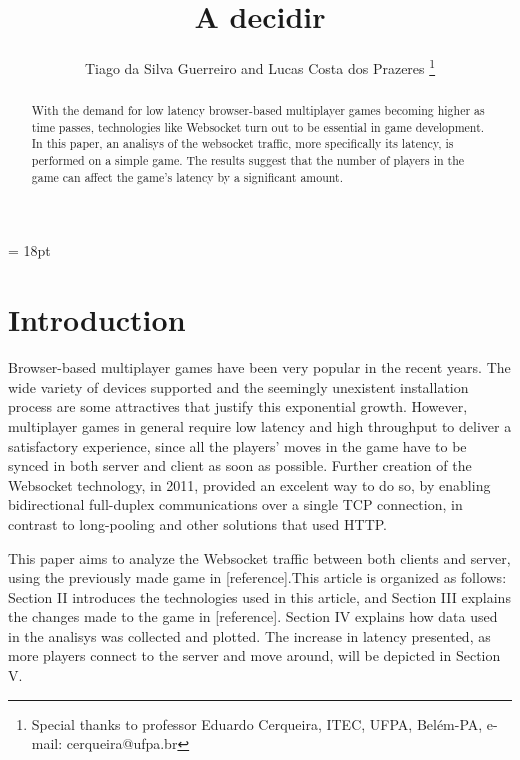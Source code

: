 \documentclass[english]{sbrt}
\begin{document}

\title{A decidir}

\author{Tiago da Silva Guerreiro and Lucas Costa dos Prazeres
  \thanks{Special thanks to professor Eduardo Cerqueira, ITEC, UFPA, Belém-PA, e-mail: cerqueira@ufpa.br}
}

\maketitle

\baselineskip = 18pt


\begin{abstract}
  With the demand for low latency browser-based multiplayer games becoming higher as time passes, technologies like Websocket turn out to be essential in game development. In this paper, an analisys of the websocket traffic, more specifically its latency, is performed on a simple game. The results suggest that the number of players in the game can affect the game's latency by a significant amount.
\end{abstract}

\begin{keywords}

\end{keywords}

\section{\textbf{Introduction}}
Browser-based multiplayer games have been very popular in the recent years. The wide variety of devices supported and the seemingly unexistent installation process are some attractives that justify this exponential growth. However, multiplayer games in general require low latency and high throughput to deliver a satisfactory experience, since all the players' moves in the game have to be synced in both server and client as soon as possible. Further creation of the Websocket technology, in 2011, provided an excelent way to do so, by enabling bidirectional full-duplex communications over a single TCP connection, in contrast to long-pooling and other solutions that used HTTP.

This paper aims to analyze the Websocket traffic between both clients and server, using the previously made game in [reference].This article is organized as follows: Section II introduces the technologies used in this article, and Section III explains the changes made to the game in [reference]. Section IV explains how data used in the analisys was collected and plotted. The increase in latency presented, as more players connect to the server and move around, will be depicted in Section V.
\end{document}

